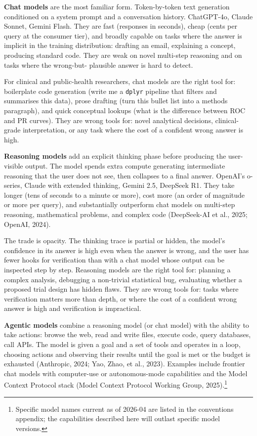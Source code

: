 \documentclass[
  letterpaper,
  11pt]{scrbook}
\begin{document}
\textbf{Chat models} are the most familiar form. Token-by-token text
generation conditioned on a system prompt and a conversation history.
ChatGPT-4o, Claude Sonnet, Gemini Flash. They are fast (responses in
seconds), cheap (cents per query at the consumer tier), and broadly
capable on tasks where the answer is implicit in the training
distribution: drafting an email, explaining a concept, producing
standard code. They are weak on novel multi-step reasoning and on tasks
where the wrong-but- plausible answer is hard to detect.

For clinical and public-health researchers, chat models are the right
tool for: boilerplate code generation (write me a \texttt{dplyr}
pipeline that filters and summarises this data), prose drafting (turn
this bullet list into a methods paragraph), and quick conceptual lookups
(what is the difference between ROC and PR curves). They are wrong tools
for: novel analytical decisions, clinical-grade interpretation, or any
task where the cost of a confident wrong answer is high.

\textbf{Reasoning models} add an explicit thinking phase before
producing the user-visible output. The model spends extra compute
generating intermediate reasoning that the user does not see, then
collapses to a final answer. OpenAI's o-series, Claude with extended
thinking, Gemini 2.5, DeepSeek R1. They take longer (tens of seconds to
a minute or more), cost more (an order of magnitude or more per query),
and substantially outperform chat models on multi-step reasoning,
mathematical problems, and complex code ({DeepSeek-AI et al.}, 2025;
OpenAI, 2024).

The trade is opacity. The thinking trace is partial or hidden, the
model's confidence in its answer is high even when the answer is wrong,
and the user has fewer hooks for verification than with a chat model
whose output can be inspected step by step. Reasoning models are the
right tool for: planning a complex analysis, debugging a non-trivial
statistical bug, evaluating whether a proposed trial design has hidden
flaws. They are wrong tools for: tasks where verification matters more
than depth, or where the cost of a confident wrong answer is high and
verification is impractical.

\textbf{Agentic models} combine a reasoning model (or chat model) with
the ability to take actions: browse the web, read and write files,
execute code, query databases, call APIs. The model is given a goal and
a set of tools and operates in a loop, choosing actions and observing
their results until the goal is met or the budget is exhausted
(Anthropic, 2024; Yao, Zhao, et al., 2023). Examples include frontier
chat models with computer-use or autonomous-mode capabilities and the
Model Context Protocol stack (Model Context Protocol Working Group,
2025).\footnote{Specific model names current as of 2026-04 are listed in
  the conventions appendix; the capabilities described here will outlast
  specific model versions.}
\end{document}

